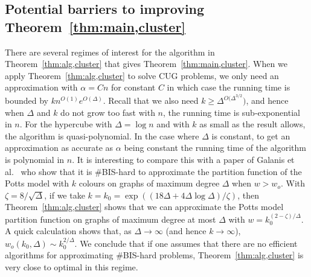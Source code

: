 \documentclass[10pt,a4paper]{article}
\theoremstyle{definition}
\begin{document}
\subsection{Potential barriers to improving Theorem~\ref{thm:main,cluster}}\label{sec:barrers,cluster}
%
There are several regimes of interest for the algorithm in Theorem~\ref{thm:alg,cluster} that gives Theorem~\ref{thm:main,cluster}.
When we apply Theorem~\ref{thm:alg,cluster} to solve CUG problems, we only need an approximation with $\alpha = Cn$ for constant $C$ in which case the running time is bounded by $kn^{O(1)}e^{O(\Delta)}$. 
Recall that we also need $k\ge \Delta^{O(\Delta^{3/2}})$, and hence when $\Delta$ and $k$ do not grow too fast with $n$, the running time is sub-exponential in $n$. 
For the hypercube with $\Delta=\log n$ and with $k$ as small as the result allows, the algorithm is quasi-polynomial.
In the case where $\Delta$ is constant, to get an approximation as accurate as $\alpha$ being constant the running time of the algorithm is polynomial in $n$.
It is interesting to compare this with a paper of Galanis et al.~\cite{GSVY16} who show that it is \#BIS-hard to approximate the partition function of the Potts model with $k$ colours on graphs of maximum degree $\Delta$ when $w>w_o$. 
With $\zeta=8/\sqrt\Delta$, if we take $k=k_0=\exp((18\Delta+4\Delta\log\Delta)/\zeta)$, then Theorem~\ref{thm:alg,cluster} shows that we can approximate the Potts model partition function on graphs of maximum degree at most $\Delta$ with $w=k_0^{(2-\zeta)/\Delta}$. 
A quick calculation shows that, as $\Delta\to \infty$ (and hence $k\to\infty$), $w_o(k_0,\Delta)\sim k_0^{2/\Delta}$. 
We conclude that if one assumes that there are no efficient algorithms for approximating \#BIS-hard problems, Theorem~\ref{thm:alg,cluster} is very close to optimal in this regime.
%
%

\appendix
\end{document}
